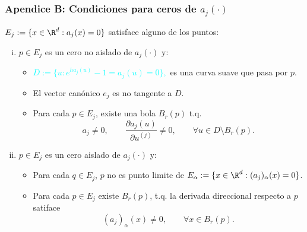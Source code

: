 \begin{frame}[noframenumbering]
    \frametitle{Apendice B: Condiciones para ceros de $a_j(\cdot)$}    
        \textcolor{orange}{
             $E_j:=\{x\in \R^{d}: a_j(x)=0\}$
        } satisface alguno de los puntos:
        \begin{enumerate}[(i)]
            \item
                 $p \in E_j$ es un cero no aislado de  $a_j(\cdot)$ y:
            \begin{itemize}
                \item  
                    \textcolor{cyan}{
                    $
                        D:=\{u: e^{ha_j(u)}-1=a_j(u)= 0\},
                    $ 
                }
                es una curva suave que pasa por $p$. 
                \item
                El vector canónico $e_j$ es no tangente a $D$.
                \item
                    Para cada $p \in E_j$, existe una bola $B_r(p)$ t.q.
                $$
                    a_j\neq 0, \qquad
                    \frac{\partial a_j(u)}{\partial u^{(j)}} \neq 0 ,\qquad 
                    \forall u \in D
                    \setminus B_r(p).
                $$
            \end{itemize}   
            \item
                 $p \in E_j$ es un cero aislado de $a_j(\cdot)$ y:
            \begin{itemize}
                \item
                    Para cada $q\in E_j$,  $p$ no es punto limite de
                    $E_{\alpha}:=\{x \in \R^d: (a_j)_\alpha(x)=0\}$.
                \item
                    Para cada $p \in E_j$ existe  $B_r(p)$, t.q.
                    la derivada direccional respecto a $p$ satiface
                $$
                (a_j)_\alpha(x) \neq 0, \qquad \forall x\in B_r(p).
                $$
            \end{itemize}       
        \end{enumerate}
\end{frame}
